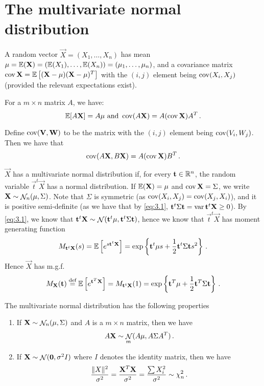 \section{The multivariate normal distribution}
A random vector $\vec{X} = (X_1, \dotsc, X_n)$ has mean $\mathbf{\mu} = \mathbb{E} (\mathbf{X}) = (\mathbb{E}(X_1), \dotsc, \mathbb{E}(X_n)) = (\mu_1, \dotsc, \mu_n)$, and a covariance matrix $\operatorname{cov} \mathbf{X} = \mathbb{E} \left[ (\mathbf{X} - \mathbf{\mu})(\mathbf{X} - \mathbf{\mu})^T \right]$ with the $(i, j)$ element being $\operatorname{cov} (X_i, X_j)$ (provided the relevant expectations exist).

For a $m \times n$ matrix $A$, we have:
\begin{equation}
  \label{eq:3.1}
\mathbb{E} [A\mathbf{X}] = A \mathbf{\mu} \text{ and } \operatorname{cov} (A\mathbf{X}) = A (\operatorname{cov} \mathbf{X}) A^T \, {.}
\end{equation}

Define $\operatorname{cov}( \mathbf{V}, \mathbf{W} )$ to be the matrix with the $(i, j)$ element being $\operatorname{cov} (V_i, W_j)$. Then we have that
\[
\operatorname{cov} (A\mathbf{X}, B\mathbf{X}) = A (\operatorname{cov} \mathbf{X}) B^T \, {.}
\]

$\vec{X}$ has a multivariate normal distribution if, for every $\mathbf{t} \in \mathbb{R}^n$, the random variable $\vec{t}^t\vec{X}$ has a normal distribution.
If $\mathbb{E}(\mathbf{X}) = \mathbf{\mu}$ and $\operatorname{cov} \mathbf{X} = \Sigma$, we write $\mathbf{X} \sim \mathop{\mathcal{N}}_n (\mathbf{\mu}, \Sigma)$.
Note that $\Sigma$ is symmetric (as $\operatorname{cov} (X_i, X_j) = \operatorname{cov}(X_j, X_i)$), and it is positive semi-definite (as we have that by \eqref{eq:3.1}, $\mathbf{t}^t\Sigma\mathbf{t} = \operatorname{var} \mathbf{t}^t \mathbf{X} \geq 0$).
By \eqref{eq:3.1}, we know that $\mathbf{t}^t\mathbf{X} \sim \mathop{\mathcal{N}}(\mathbf{t}^t\mathbf{\mu}, \mathbf{t}^t\Sigma\mathbf{t})$, hence we know that $\vec{t}^t\vec{X}$ has moment generating function
\[
M_{\mathbf{t}^t\mathbf{X}}(s) = \mathbb{E}\left[ e^{s \mathbf{t}^t\mathbf{X}} \right] = \exp \left\{ \mathbf{t}^t\mathbf{\mu}s + \frac{1}{2} \mathbf{t}^t\Sigma\mathbf{t} s^2 \right\}\, {.}
\]
Hence $\vec{X}$ has m.g.f.
\begin{equation}
  \label{eq:3.2}
M_{\mathbf{X}}(\mathbf{t}) \stackrel{\text{def}}{=} \mathbb{E} \left[e^{\mathbf{t}^T\mathbf{X}}\right] = M_{\mathbf{t}^t\mathbf{X}}(1) = \exp \left\{ \mathbf{t}^T\mathbf{\mu} + \frac{1}{2}\mathbf{t}^T\Sigma\mathbf{t} \right\} \, {.}
\end{equation}

\begin{proposition}[label=prop:3.1]
The multivariate normal distribution has the following properties
\begin{enumerate}
\item If $\mathbf{X} \sim \mathop{\mathcal{N}}_n(\mathbf{\mu}, \Sigma)$ and $A$ is a $m \times n$ matrix, then we have
\[
A\mathbf{X} \sim \mathop{\mathcal{N}}_m(A\mathbf{\mu}, A \Sigma A^T) \, {.}
\]
\item If $\mathbf{X} \sim \mathop{\mathcal{N}}(\mathbf{0}, \sigma^2 I)$ where $I$ denotes the identity matrix, then we have
\[
\frac{\lVert X\rVert^2}{\sigma^2} = \frac{\mathbf{X}^T\mathbf{X}}{\sigma^2} = \frac{\sum X_i^2}{\sigma^2} \sim \chi^2_n \, {.}
\]
\end{enumerate}
\end{proposition}

